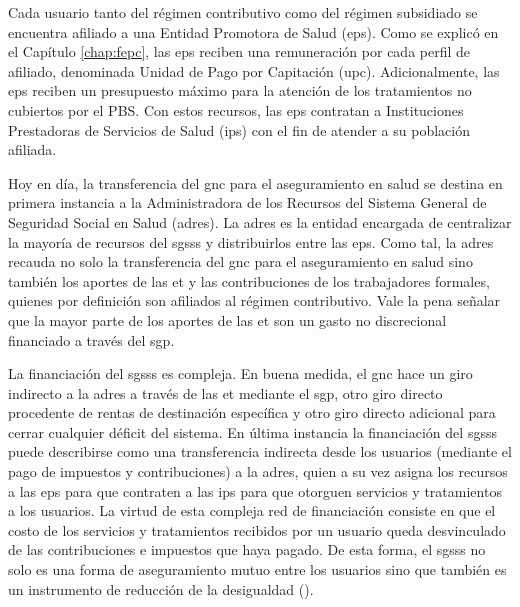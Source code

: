 Cada usuario tanto del régimen contributivo como del régimen subsidiado se encuentra afiliado a una Entidad Promotora de Salud (\gls{eps}). Como se explicó en el Capítulo \ref{chap:fepc}, las \gls{eps} reciben una remuneración por cada perfil de afiliado, denominada Unidad de Pago por Capitación (\gls{upc}). Adicionalmente, las \gls{eps} reciben un presupuesto máximo para la atención de los tratamientos no cubiertos por el PBS. Con estos recursos, las \gls{eps} contratan a Instituciones Prestadoras de Servicios de Salud (\gls{ips}) con el fin de atender a su población afiliada.

Hoy en día, la transferencia del \gls{gnc} para el aseguramiento en salud se destina en primera instancia a la Administradora de los Recursos del Sistema General de Seguridad Social en Salud (\gls{adres}). La \gls{adres} es la entidad encargada de centralizar la mayoría de recursos del \gls{sgsss} y distribuirlos entre las \gls{eps}. Como tal, la \gls{adres} recauda no solo la transferencia del \gls{gnc} para el aseguramiento en salud sino también los aportes de las \gls{et} y las contribuciones de los trabajadores formales, quienes por definición son afiliados al régimen contributivo. Vale la pena señalar que la mayor parte de los aportes de las \gls{et} son un gasto no discrecional financiado a través del \gls{sgp}. 

La financiación del \gls{sgsss} es compleja. En buena medida, el \gls{gnc} hace un giro indirecto a la \gls{adres} a través de las \gls{et} mediante el \gls{sgp}, otro giro directo procedente de rentas de destinación específica y otro giro directo adicional para cerrar cualquier déficit del sistema. En última instancia la financiación del \gls{sgsss} puede describirse como una transferencia indirecta desde los usuarios (mediante el pago de impuestos y contribuciones) a la \gls{adres}, quien a su vez asigna los recursos a las \gls{eps} para que contraten a las \gls{ips} para que otorguen servicios y tratamientos a los usuarios. La virtud de esta compleja red de financiación consiste en que el costo de los servicios y tratamientos recibidos por un usuario queda desvinculado de las contribuciones e impuestos que haya pagado. De esta forma, el \gls{sgsss} no solo es una forma de aseguramiento mutuo entre los usuarios sino que también es un instrumento de reducción de la desigualdad (\cite{BID2012}).   


